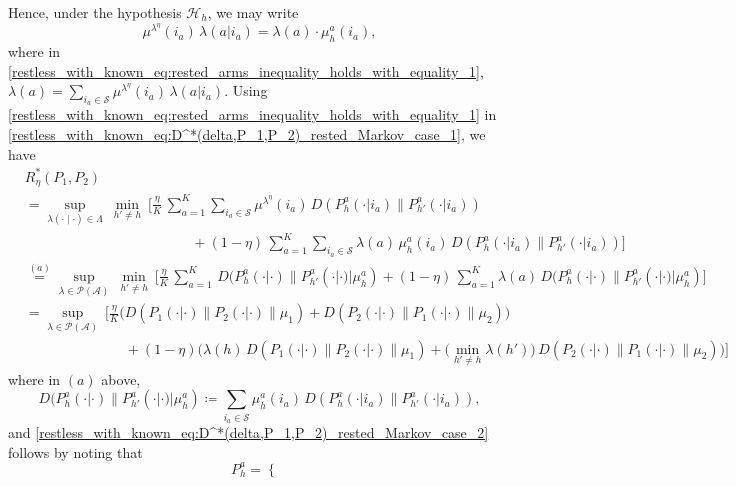 {\color{black} Hence, under the hypothesis $\mathcal{H}_h$, we may write 
\begin{equation}
\mu^{\lambda^\eta}(i_a)\,\lambda(a|i_a)=\lambda(a) \cdot \mu_h^a(i_a),
\label{restless_with_known_eq:rested_arms_inequality_holds_with_equality_1}
\end{equation}
where in \eqref{restless_with_known_eq:rested_arms_inequality_holds_with_equality_1}, $\lambda(a)=\sum\limits_{i_a \in \mathcal{S}} \mu^{\lambda^\eta}(i_a)\,\lambda(a|i_a)$. Using \eqref{restless_with_known_eq:rested_arms_inequality_holds_with_equality_1} in \eqref{restless_with_known_eq:D^*(delta,P_1,P_2)_rested_Markov_case_1}, we have
\begin{align}
&R_\eta^*(P_1,P_2)\nonumber\\
&=\sup\limits_{\lambda(\cdot\mid\cdot)\in \Lambda}~ \min\limits_{h'\neq h} ~\bigg[\frac{\eta}{K}\,\sum\limits_{a=1}^{K}\sum\limits_{i_a\in\mathcal{S}}\mu^{\lambda^\eta}(i_a) \,D(P_h^a(\cdot|i_a)\|P_{h'}^a(\cdot|i_a))\nonumber\\
	&\hspace{5cm}+(1-\eta)\,\sum\limits_{a=1}^{K} \sum\limits_{i_a\in\mathcal{S}}\lambda(a) \, \mu_h^a(i_a)\,D(P_h^a(\cdot|i_a)\|P_{h'}^a(\cdot|i_a))\bigg]\nonumber\\
	&\stackrel{(a)}{=}\sup\limits_{\lambda\in \mathcal{P}(\mathcal{A})}~ \min\limits_{h'\neq h} ~\bigg[\frac{\eta}{K}\,\sum\limits_{a=1}^{K} \,D(P_h^a(\cdot|\cdot )\|P_{h'}^a(\cdot|\cdot) | \mu_h^a)+(1-\eta)\,\sum\limits_{a=1}^{K} \lambda(a)\,D(P_h^a(\cdot|\cdot )\|P_{h'}^a(\cdot|\cdot) | \mu_h^a)\bigg]\nonumber\\
	&=\sup\limits_{\lambda\in \mathcal{P}(\mathcal{A})}~\bigg[\frac{\eta}{K}\bigg(D(P_1(\cdot|\cdot)\|P_2(\cdot|\cdot)\|\mu_1) + D(P_2(\cdot|\cdot)\|P_1(\cdot|\cdot)\|\mu_2)\bigg)\nonumber\\
	&\hspace{3cm}+(1-\eta)\bigg(\lambda(h)\, D(P_1(\cdot|\cdot)\|P_2(\cdot|\cdot)\|\mu_1) + \bigg(\min\limits_{h'\neq h} \lambda(h')\bigg)\,D(P_2(\cdot|\cdot)\|P_1(\cdot|\cdot)\|\mu_2)\bigg)\bigg]\
	\label{restless_with_known_eq:D^*(delta,P_1,P_2)_rested_Markov_case_2}
\end{align}
where in $(a)$ above, 
$$
D(P_h^a(\cdot|\cdot )\|P_{h'}^a(\cdot|\cdot) | \mu_h^a) \coloneqq \sum\limits_{i_a\in\mathcal{S}} \mu_h^a(i_a)\,D(P_h^a(\cdot|i_a)\|P_{h'}^a(\cdot|i_a)),
$$
and \eqref{restless_with_known_eq:D^*(delta,P_1,P_2)_rested_Markov_case_2} follows by noting that 
\begin{equation}
P_h^a=\begin{cases}

\end{cases}
\end{equation}}
